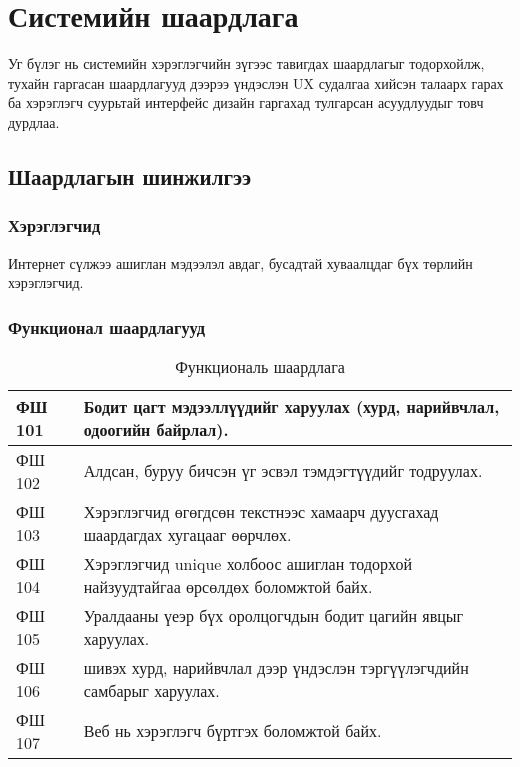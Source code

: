 \chapter{Системийн шаардлага}

Уг бүлэг нь системийн хэрэглэгчийн зүгээс тавигдах шаардлагыг тодорхойлж, тухайн гаргасан шаардлагууд дээрээ үндэслэн UX судалгаа хийсэн талаарх гарах ба хэрэглэгч суурьтай интерфейс дизайн гаргахад тулгарсан асуудлуудыг товч дурдлаа.

\section{Шаардлагын шинжилгээ}

\subsection{Хэрэглэгчид}

Интернет сүлжээ ашиглан мэдээлэл авдаг, бусадтай хуваалцдаг бүх төрлийн хэрэглэгчид. 

\subsection{Функционал шаардлагууд}

\begin{table}[h]
	\centering
	\caption{Функциональ шаардлага}
	\begin{tabular}{ |p{2cm}|p{13cm}| }
		\hline
		ФШ 101 & Бодит цагт мэдээллүүдийг харуулах (хурд, нарийвчлал, одоогийн байрлал).           \\ \hline
		ФШ 102 & Алдсан, буруу бичсэн үг эсвэл тэмдэгтүүдийг тодруулах.                            \\ \hline
		ФШ 103 & Хэрэглэгчид өгөгдсөн текстнээс хамаарч дуусгахад шаардагдах хугацааг өөрчлөх.     \\ \hline
		ФШ 104 & Хэрэглэгчид unique холбоос ашиглан тодорхой найзуудтайгаа өрсөлдөх боломжтой байх. \\ \hline
		ФШ 105 & Уралдааны үеэр бүх оролцогчдын бодит цагийн явцыг харуулах.                        \\ \hline
		ФШ 106 & шивэх хурд, нарийвчлал дээр үндэслэн тэргүүлэгчдийн самбарыг харуулах.             \\  \hline
		ФШ 107 & Веб нь хэрэглэгч бүртгэх боломжтой байх.                                           \\ \hline
	\end{tabular}
\end{table}

